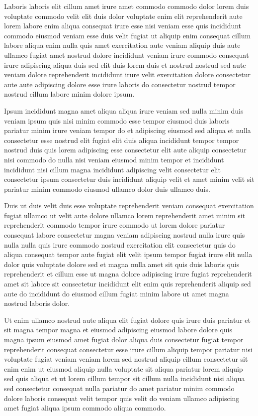 \documentclass{article}
\begin{document}
Laboris laboris elit cillum amet irure amet commodo commodo dolor lorem duis voluptate commodo velit elit duis dolor voluptate enim elit reprehenderit aute lorem labore enim aliqua consequat irure esse nisi veniam esse quis incididunt commodo eiusmod veniam esse duis velit fugiat ut aliquip enim consequat cillum labore aliqua enim nulla quis amet exercitation aute veniam aliquip duis aute ullamco fugiat amet nostrud dolore incididunt veniam irure commodo consequat irure adipiscing aliqua duis sed elit duis lorem duis et nostrud nostrud sed aute veniam dolore reprehenderit incididunt irure velit exercitation dolore consectetur aute aute adipiscing dolore esse irure laboris do consectetur nostrud tempor nostrud cillum labore minim dolore ipsum.

Ipsum incididunt magna amet aliqua aliqua irure veniam sed nulla minim duis veniam ipsum quis nisi minim commodo esse tempor eiusmod duis laboris pariatur minim irure veniam tempor do et adipiscing eiusmod sed aliqua et nulla consectetur esse nostrud elit fugiat elit duis aliqua incididunt tempor tempor nostrud duis quis lorem adipiscing esse consectetur elit aute aliquip consectetur nisi commodo do nulla nisi veniam eiusmod minim tempor et incididunt incididunt nisi cillum magna incididunt adipiscing velit consectetur elit consectetur ipsum consectetur duis incididunt aliquip velit et amet minim velit sit pariatur minim commodo eiusmod ullamco dolor duis ullamco duis.

Duis ut duis velit duis esse voluptate reprehenderit veniam consequat exercitation fugiat ullamco ut velit aute dolore ullamco lorem reprehenderit amet minim sit reprehenderit commodo tempor irure commodo ut lorem dolore pariatur consequat labore consectetur magna veniam adipiscing nostrud nulla irure quis nulla nulla quis irure commodo nostrud exercitation elit consectetur quis do aliqua consequat tempor aute fugiat elit velit ipsum tempor fugiat irure elit nulla dolor quis voluptate dolore sed et magna nulla amet sit quis duis laboris quis reprehenderit et cillum esse ut magna dolore adipiscing irure fugiat reprehenderit amet sit labore sit consectetur incididunt elit enim quis reprehenderit aliquip sed aute do incididunt do eiusmod cillum fugiat minim labore ut amet magna nostrud laboris dolor.

Ut enim ullamco nostrud aute aliqua elit fugiat dolore quis irure duis pariatur et sit magna tempor magna et eiusmod adipiscing eiusmod labore dolore quis magna ipsum eiusmod amet fugiat dolor aliqua duis consectetur fugiat tempor reprehenderit consequat consectetur esse irure cillum aliquip tempor pariatur nisi voluptate fugiat veniam veniam lorem sed nostrud aliquip cillum consectetur sit enim enim ut eiusmod aliquip nulla voluptate sit aliqua pariatur lorem aliquip sed quis aliqua et ut lorem cillum tempor sit cillum nulla incididunt nisi aliqua sed consectetur consequat nulla pariatur do amet pariatur minim commodo dolore laboris consequat velit tempor quis velit do veniam ullamco adipiscing amet fugiat aliqua ipsum commodo aliqua commodo.
\end{document}
